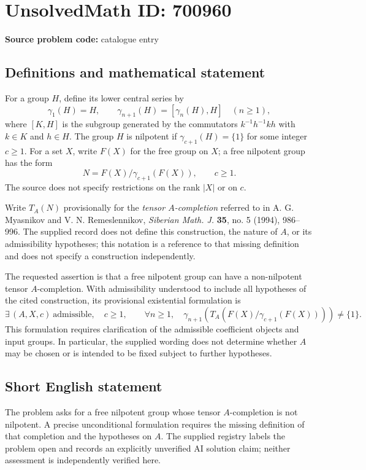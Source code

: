 \documentclass[11pt]{article}
\begin{document}
\section*{UnsolvedMath ID: 700960}
\textbf{Source problem code:} catalogue entry
\subsection{Definitions and mathematical statement}
For a group \(H\), define its lower central series by
\[
\gamma_1(H)=H,\qquad
\gamma_{n+1}(H)=[\gamma_n(H),H]\quad(n\geq 1),
\]
where \([K,H]\) is the subgroup generated by the commutators \(k^{-1}h^{-1}kh\) with \(k\in K\) and \(h\in H\). The group \(H\) is nilpotent if \(\gamma_{c+1}(H)=\{1\}\) for some integer \(c\geq 1\). For a set \(X\), write \(F(X)\) for the free group on \(X\); a free nilpotent group has the form
\[
N=F(X)/\gamma_{c+1}(F(X)),\qquad c\geq 1.
\]
The source does not specify restrictions on the rank \(\lvert X\rvert\) or on \(c\).

Write \(T_A(N)\) provisionally for the \emph{tensor \(A\)-completion} referred to in A. G. Myasnikov and V. N. Remeslennikov, \emph{Siberian Math. J.} \textbf{35}, no. 5 (1994), 986--996. The supplied record does not define this construction, the nature of \(A\), or its admissibility hypotheses; this notation is a reference to that missing definition and does not specify a construction independently.

The requested assertion is that a free nilpotent group can have a non-nilpotent tensor \(A\)-completion. With admissibility understood to include all hypotheses of the cited construction, its provisional existential formulation is
\[
\exists\,(A,X,c)\ \text{admissible},\quad c\geq 1,\qquad
\forall n\geq 1,\quad
\gamma_{n+1}\!\left(T_A\!\left(F(X)/\gamma_{c+1}(F(X))\right)\right)\neq\{1\}.
\]
This formulation requires clarification of the admissible coefficient objects and input groups. In particular, the supplied wording does not determine whether \(A\) may be chosen or is intended to be fixed subject to further hypotheses.
\subsection{Short English statement}
The problem asks for a free nilpotent group whose tensor \(A\)-completion is not nilpotent. A precise unconditional formulation requires the missing definition of that completion and the hypotheses on \(A\). The supplied registry labels the problem open and records an explicitly unverified AI solution claim; neither assessment is independently verified here.
\end{document}
